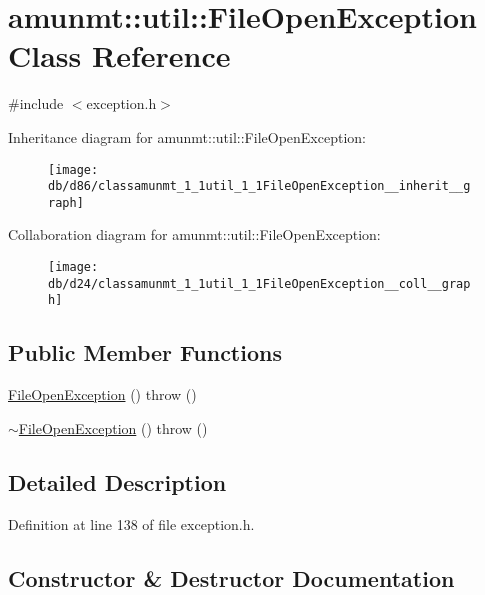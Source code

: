 \hypertarget{classamunmt_1_1util_1_1FileOpenException}{}\section{amunmt\+:\+:util\+:\+:File\+Open\+Exception Class Reference}
\label{classamunmt_1_1util_1_1FileOpenException}


{\ttfamily \#include $<$exception.\+h$>$}



Inheritance diagram for amunmt\+:\+:util\+:\+:File\+Open\+Exception\+:
\nopagebreak
\begin{figure}[H]
\begin{center}
\leavevmode
\texttt{[image: db/d86/classamunmt\_1\_1util\_1\_1FileOpenException\_\_inherit\_\_graph]}
\end{center}
\end{figure}


Collaboration diagram for amunmt\+:\+:util\+:\+:File\+Open\+Exception\+:
\nopagebreak
\begin{figure}[H]
\begin{center}
\leavevmode
\texttt{[image: db/d24/classamunmt\_1\_1util\_1\_1FileOpenException\_\_coll\_\_graph]}
\end{center}
\end{figure}
\subsection*{Public Member Functions}
\begin{DoxyCompactItemize}
\item 
\hyperlink{classamunmt_1_1util_1_1FileOpenException_af42dbe62d8a394be50c0c49338738649}{File\+Open\+Exception} ()  throw ()
\item 
\hyperlink{classamunmt_1_1util_1_1FileOpenException_a147314afb6a34f80a520e85b80072934}{$\sim$\+File\+Open\+Exception} ()  throw ()
\end{DoxyCompactItemize}


\subsection{Detailed Description}


Definition at line 138 of file exception.\+h.



\subsection{Constructor \& Destructor Documentation}
